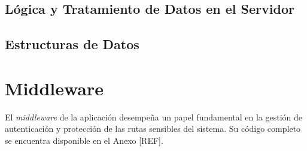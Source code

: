 \subsection{Lógica y Tratamiento de Datos en el Servidor}

\subsection{Estructuras de Datos}

\section{Middleware}







El \textit{middleware} de la aplicación desempeña un papel fundamental en la gestión de autenticación y protección de las rutas sensibles del sistema. Su código completo se encuentra disponible en el Anexo [REF].

